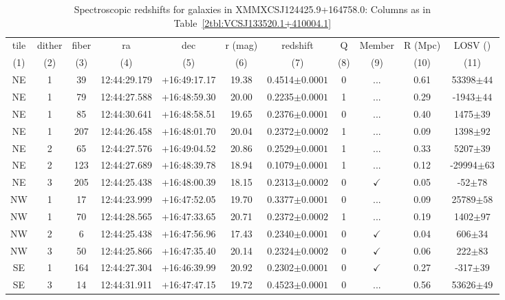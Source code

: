 \begin{landscape}
	\begin{table}
		\centering 
		\caption[Spectroscopic redshifts for galaxies in XMMXCSJ124425.9+164758.0.]{Spectroscopic redshifts for galaxies in XMMXCSJ124425.9+164758.0: Columns as in Table~\ref{2tbl:VCSJ133520.1+410004.1}}
		\begin{tabular}{ccccccccccc}
			\hline
			tile & dither & fiber & ra & dec & r (mag) & redshift & Q & Member & R (Mpc) & LOSV (\kms) \\
			(1) & (2) & (3) & (4) & (5) & (6) & (7) & (8) & (9) & (10) & (11) \\
			\hline \hline
	NE & 1 & 39 & 12:44:29.179 & +16:49:17.17 & 19.38 & 0.4514$\pm{0.0001}$ & 0 & ... & 0.61 & 53398$\pm{44}$ \\
	NE & 1 & 79 & 12:44:27.588 & +16:48:59.30 & 20.00 & 0.2235$\pm{0.0001}$ & 1 & ... & 0.29 & -1943$\pm{44}$ \\
	NE & 1 & 85 & 12:44:30.641 & +16:48:58.51 & 19.65 & 0.2376$\pm{0.0001}$ & 0 & ... & 0.40 & 1475$\pm{39}$ \\
	NE & 1 & 207 & 12:44:26.458 & +16:48:01.70 & 20.04 & 0.2372$\pm{0.0002}$ & 1 & ... & 0.09 & 1398$\pm{92}$ \\
	NE & 2 & 65 & 12:44:27.576 & +16:49:04.52 & 20.86 & 0.2529$\pm{0.0001}$ & 1 & ... & 0.33 & 5207$\pm{39}$ \\
	NE & 2 & 123 & 12:44:27.689 & +16:48:39.78 & 18.94 & 0.1079$\pm{0.0001}$ & 1 & ... & 0.12 & -29994$\pm{63}$ \\
	NE & 3 & 205 & 12:44:25.438 & +16:48:00.39 & 18.15 & 0.2313$\pm{0.0002}$ & 0 & $\checkmark$ & 0.05 & -52$\pm{78}$ \\
	NW & 1 & 17 & 12:44:23.999 & +16:47:52.05 & 19.70 & 0.3377$\pm{0.0001}$ & 0 & ... & 0.09 & 25789$\pm{58}$ \\
	NW & 1 & 70 & 12:44:28.565 & +16:47:33.65 & 20.71 & 0.2372$\pm{0.0002}$ & 1 & ... & 0.19 & 1402$\pm{97}$ \\
	NW & 2 & 6 & 12:44:25.438 & +16:47:56.96 & 17.43 & 0.2340$\pm{0.0001}$ & 0 & $\checkmark$ & 0.04 & 606$\pm{34}$ \\
	NW & 3 & 50 & 12:44:25.866 & +16:47:35.40 & 20.14 & 0.2324$\pm{0.0002}$ & 0 & $\checkmark$ & 0.06 & 222$\pm{83}$ \\
	SE & 1 & 164 & 12:44:27.304 & +16:46:39.99 & 20.92 & 0.2302$\pm{0.0001}$ & 0 & $\checkmark$ & 0.27 & -317$\pm{39}$ \\
	SE & 3 & 14 & 12:44:31.911 & +16:47:47.15 & 19.72 & 0.4523$\pm{0.0001}$ & 0 & ... & 0.56 & 53626$\pm{49}$ \\

\end{tabular}
\end{table}
\end{landscape}
